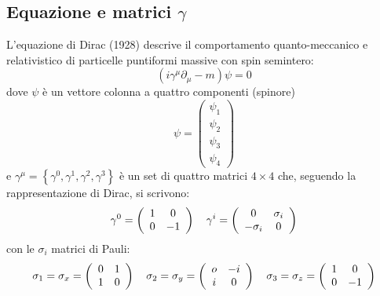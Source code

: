 \documentclass{subnucbo}
\begin{document}
\subsection{Equazione e matrici $\gamma$}
L'equazione di Dirac (1928) descrive il comportamento quanto-meccanico e relativistico di particelle puntiformi massive con spin semintero:
\begin{equation}
        \left( i \gamma ^ { \mu } \partial _ { \mu } - m \right) \psi = 0
        \label{eq:dirac_equation}
\end{equation}
dove $\psi$ è un vettore colonna a quattro componenti (spinore)
\begin{equation}
        \psi = \left( \begin{array} { c } { \psi _ { 1 } } \\ { \psi _ { 2 } } \\ { \psi _ { 3 } } \\ { \psi _ { 4 } } \end{array} \right)
        \label{eq:spinor}
\end{equation}
e $\gamma^{\mu} = \left\{ \gamma ^ { 0 } , \gamma ^ { 1 } , \gamma ^ { 2 } , \gamma ^ { 3 } \right\}$ è un set di quattro matrici $4\times 4$ che, seguendo la rappresentazione di Dirac, si scrivono:
\begin{equation}
        \gamma ^ { 0 } = \left( \begin{array} { c c } { 1 } & { 0 } \\ { 0 } & { - 1 } \end{array} \right) \quad \gamma ^ { i } = \left( \begin{array} { c c } { 0 } & { \sigma _ { i } } \\ { - \sigma _ { i } } & { 0 } \end{array} \right)
        \label{eq:gamma_components}
\end{equation}
con le $\sigma_{i}$ matrici di Pauli:
\begin{equation}
        \sigma_{1} = \sigma _ { x } = \left( \begin{array} { c c } { 0 } & { 1 } \\ { 1 } & { 0 } \end{array} \right) \quad \sigma_{2} = \sigma _ { y } = \left( \begin{array} { c c } { o } & { - i } \\ { i } & { 0 } \end{array} \right) \quad \sigma_{3} = \sigma _ { z } = \left( \begin{array} { c c } { 1 } & { 0 } \\ { 0 } & { - 1 } \end{array} \right)
        \label{eq:pauli_matrices}
\end{equation}
\end{document}
